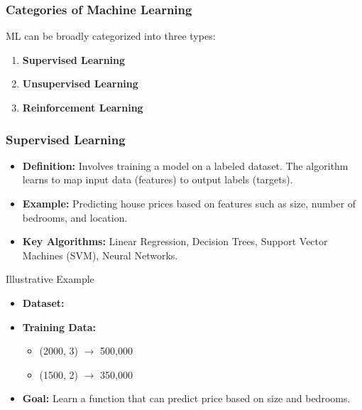 \documentclass{beamer}
\begin{document}
\begin{frame}[fragile]
    \frametitle{Categories of Machine Learning}
    ML can be broadly categorized into three types:
    \begin{enumerate}
        \item \textbf{Supervised Learning}
        \item \textbf{Unsupervised Learning}
        \item \textbf{Reinforcement Learning}
    \end{enumerate}
\end{frame}

\begin{frame}[fragile]
    \frametitle{Supervised Learning}
    \begin{itemize}
        \item \textbf{Definition:} Involves training a model on a labeled dataset. The algorithm learns to map input data (features) to output labels (targets).
        \item \textbf{Example:} 
            Predicting house prices based on features such as size, number of bedrooms, and location.
        \item \textbf{Key Algorithms:} Linear Regression, Decision Trees, Support Vector Machines (SVM), Neural Networks.
    \end{itemize}
    \begin{block}{Illustrative Example}
        \begin{itemize}
            \item \textbf{Dataset:} 
            \item \textbf{Training Data:}
                \begin{itemize}
                    \item (2000, 3) $\rightarrow$ 500,000
                    \item (1500, 2) $\rightarrow$ 350,000
                \end{itemize}
            \item \textbf{Goal:} Learn a function that can predict price based on size and bedrooms.
        \end{itemize}
    \end{block}
\end{frame}
\end{document}
